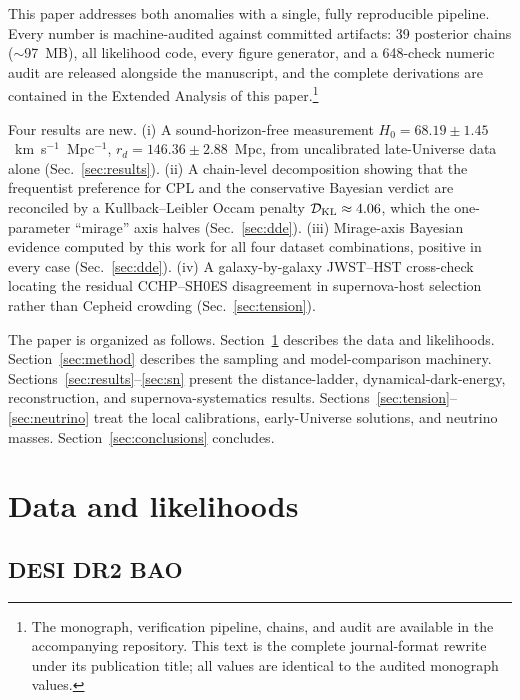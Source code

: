 \documentclass[aps,prd,preprint,superscriptaddress,nofootinbib]{revtex4-2}
\begin{document}
This paper addresses both anomalies with a single, fully reproducible pipeline. Every number is machine-audited against committed artifacts: 39 posterior chains ($\sim$97~MB), all likelihood code, every figure generator, and a 648-check numeric audit are released alongside the manuscript, and the complete derivations are contained in the Extended Analysis of this paper.\footnote{The monograph, verification pipeline, chains, and audit are available in the accompanying repository. This text is the complete journal-format rewrite under its publication title; all values are identical to the audited monograph values.}

Four results are new. (i) A sound-horizon-free measurement $H_0 = 68.19 \pm 1.45$~km~s$^{-1}$~Mpc$^{-1}$, $r_d = 146.36 \pm 2.88$~Mpc, from uncalibrated late-Universe data alone (Sec.~\ref{sec:results}). (ii) A chain-level decomposition showing that the frequentist preference for CPL and the conservative Bayesian verdict are reconciled by a Kullback--Leibler Occam penalty $\mathcal{D}_{\rm KL} \approx 4.06$, which the one-parameter ``mirage'' axis halves (Sec.~\ref{sec:dde}). (iii) Mirage-axis Bayesian evidence computed by this work for all four dataset combinations, positive in every case (Sec.~\ref{sec:dde}). (iv) A galaxy-by-galaxy JWST--HST cross-check locating the residual CCHP--SH0ES disagreement in supernova-host selection rather than Cepheid crowding (Sec.~\ref{sec:tension}).

The paper is organized as follows. Section~\ref{sec:data} describes the data and likelihoods. Section~\ref{sec:method} describes the sampling and model-comparison machinery. Sections~\ref{sec:results}--\ref{sec:sn} present the distance-ladder, dynamical-dark-energy, reconstruction, and supernova-systematics results. Sections~\ref{sec:tension}--\ref{sec:neutrino} treat the local calibrations, early-Universe solutions, and neutrino masses. Section~\ref{sec:conclusions} concludes.

\section{Data and likelihoods}
\label{sec:data}

\subsection{DESI DR2 BAO}
\end{document}
